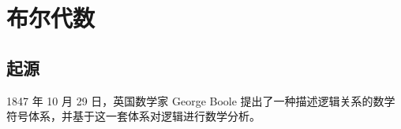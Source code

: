 \section{布尔代数}\label{sec:Calcuations/BooleanAlgebra}
    \subsection{起源}\label{subsec:Calculations/BooleanAlgebra/Origin}
        1847 年 10 月 29 日，英国数学家 George Boole 提出了一种描述逻辑关系的数学符号体系，并基于这一套体系对逻辑进行数学分析\cite{boole-1847}。
